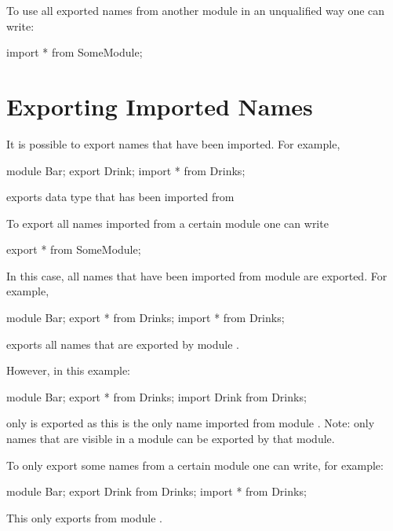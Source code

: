To use all exported names from another module in an unqualified way one can write:
\begin{abscode}
import * from SomeModule;
\end{abscode}

\section{Exporting Imported Names}
It is possible to export names that have been imported. For example,
\begin{abscode}
module Bar;
export Drink;
import * from Drinks;
\end{abscode}
exports data type  that has been imported from 

To export all names imported from a certain module one can write
\begin{abscode}
export * from SomeModule;
\end{abscode}
In this case, all names that have been imported from module  are exported. For example,
\begin{abscode}
module Bar;
export * from Drinks;
import * from Drinks;
\end{abscode}
exports all names that are exported by module .

However, in this example:
\begin{abscode}
module Bar;
export * from Drinks;
import Drink from Drinks;
\end{abscode}
only  is exported as this is the only name imported from module .
Note: only names that are visible in a module can be exported by that module.

To only export some names from a certain module one can write, for example:
\begin{abscode}
module Bar;
export Drink from Drinks;
import * from Drinks;
\end{abscode}
This only exports  from module .
